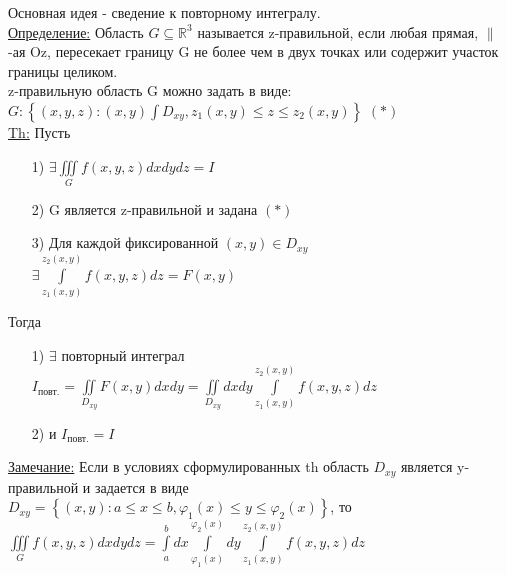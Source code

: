Основная идея - сведение к повторному интегралу. \\

\underline{Определение:} Область $G \subseteq \mathbb{R}^3$ называется z-правильной, если любая прямая, $\parallel$-ая Oz, пересекает границу G не более чем в двух точках или содержит участок границы целиком. \\

z-правильную область G можно задать в виде: \\
$G: \left\{ (x,y,z): (x,y) \int D_{xy}, z_1(x,y) \leqslant z \leqslant z_2(x,y) \right\}$ $(*)$ \\


\underline{Th:} Пусть \\
\begin{enumerate}
	\item[1)] 
	$\exists \iiint\limits_{G} f(x,y,z) dxdydz = I$
	
	\item[2)]
	G является z-правильной и задана $(*)$ 
	
	\item[3)]
	Для каждой фиксированной $(x,y) \in D_{xy}$ \\
	$\exists \int\limits_{z_1(x,y)}^{z_2(x,y)} f(x,y,z) dz = F(x,y)$
\end{enumerate}

Тогда
\begin{enumerate}
	\item[1)]
	$\exists$ повторный интеграл \\
	$I_\text{повт.} = 
	\iint\limits_{D_{xy}} F(x,y) dxdy = 
	\iint\limits_{D_{xy}} dxdy \int\limits_{z_1(x,y)}^{z_2(x,y)} f(x,y,z) dz$
	
	\item[2)]
	и $I_\text{повт.} = I$
\end{enumerate}


\underline{Замечание:} Если в условиях сформулированных th область $D_{xy}$ является y-правильной и задается в виде $D_{xy} = \left\{ (x,y): a \leqslant x \leqslant b, \varphi_1(x) \leqslant y \leqslant \varphi_2(x) \right\}$, то \\
$\iiint\limits_{G} f(x,y,z) dxdydz = 
\int\limits_{a}^{b} dx \int\limits_{\varphi_1(x)}^{\varphi_2(x)} dy \int\limits_{z_1(x,y)}^{z_2(x,y)} f(x,y,z) dz$























